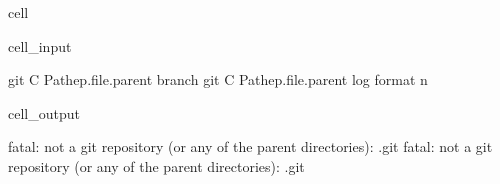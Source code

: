 \documentclass[letterpaper,table,10pt,english]{jupyterBook}
\begin{document}
\begin{sphinxuseclass}{cell}\begin{sphinxVerbatimInput}

\begin{sphinxuseclass}{cell_input}
\begin{sphinxVerbatim}[commandchars=\\\{\}]
git \PYGZhy{}C Pathep.\PYGZus{}\PYGZus{}file\PYGZus{}\PYGZus{}.parent branch
git \PYGZhy{}C Pathep.\PYGZus{}\PYGZus{}file\PYGZus{}\PYGZus{}.parent log \PYGZhy{}\PYGZhy{}format \PYGZhy{}n 
\end{sphinxVerbatim}

\end{sphinxuseclass}\end{sphinxVerbatimInput}
\begin{sphinxVerbatimOutput}

\begin{sphinxuseclass}{cell_output}
\begin{sphinxVerbatim}[commandchars=\\\{\}]
fatal: not a git repository (or any of the parent directories): .git
fatal: not a git repository (or any of the parent directories): .git
\end{sphinxVerbatim}

\end{sphinxuseclass}\end{sphinxVerbatimOutput}

\end{sphinxuseclass}
\end{document}

